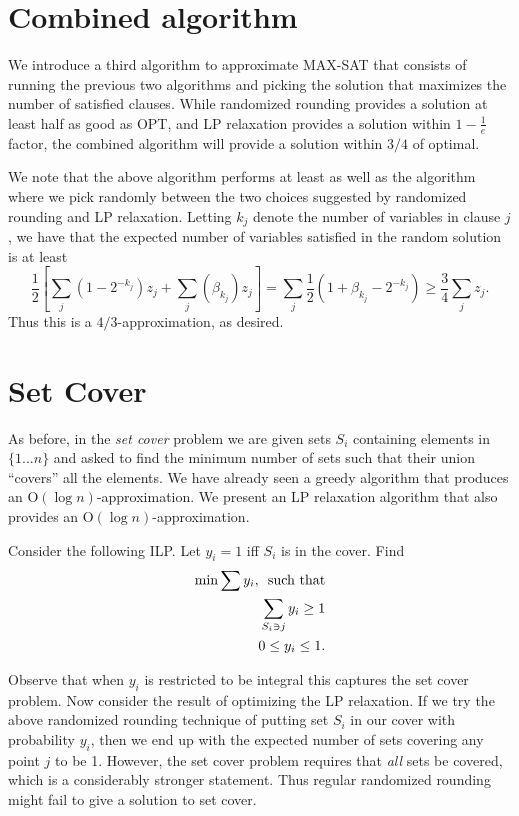 \documentclass{article}
\begin{document}
\section{Combined algorithm}
We introduce a third algorithm to approximate MAX-SAT that consists of running the previous two algorithms and picking the solution that maximizes the number of satisfied clauses.  While randomized rounding provides a solution at least half as good as OPT, and LP relaxation provides a solution within $1-\frac{1}{e}$ factor, the combined algorithm will provide a solution within $3/4$ of optimal.

We note that the above algorithm performs at least as well as the algorithm where we pick randomly between the two choices suggested by randomized rounding and LP relaxation.  Letting $k_j$ denote the number of variables in clause $j$, we have that the expected number of variables satisfied in the random solution is at least $$\frac{1}{2}\left[\sum_j(1-2^{-k_j})z_j+\sum_j(\beta_{k_j})z_j\right]=\sum_j \frac{1}{2}(1+\beta_{k_j}-2^{-k_j})\geq \frac{3}{4}\sum_j z_j.$$
Thus this is a $4/3$-approximation, as desired.

\section{Set Cover}
As before, in the \emph{set cover} problem we are given sets $S_i$ containing elements in $\{1...n\}$ and asked to find the minimum number of sets such that their union ``covers'' all the elements.  We have already seen a greedy algorithm that produces an $\textrm{O}(\log n)$-approximation.  We present an LP relaxation algorithm that also provides an $\textrm{O}(\log n)$-approximation.

Consider the following ILP.  Let $y_i=1$ iff $S_i$ is in the cover.  Find
\begin{align}
\min\sum{y_i}, \textrm{\enspace such that}\\
\sum_{S_i\ni j}y_i\geq 1\\
0\leq y_i\leq 1.
\end{align}

Observe that when $y_i$ is restricted to be integral this captures the set cover problem.  Now consider the result of optimizing the LP relaxation.  If we try the above randomized rounding technique of putting set $S_i$ in our cover with probability $y_i$, then we end up with the expected number of sets covering any point $j$ to be 1.  However, the set cover problem requires that \emph{all} sets be covered, which is a considerably stronger statement.  Thus regular randomized rounding might fail to give a solution to set cover.
\end{document}
